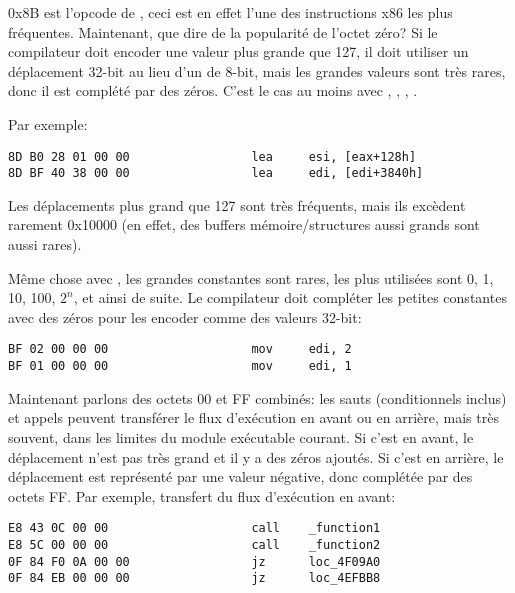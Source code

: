 0x8B est l'opcode de , ceci est en effet l'une des instructions x86 les
plus fréquentes.
Maintenant, que dire de la popularité de l'octet zéro?
Si le compilateur doit encoder une valeur plus grande que 127, il doit utiliser un
déplacement 32-bit au lieu d'un de 8-bit, mais les grandes valeurs sont très rares,
donc il est complété par des zéros.
C'est le cas au moins avec , , , .

Par exemple:

\begin{lstlisting}[style=customasmx86]
8D B0 28 01 00 00                 lea     esi, [eax+128h]
8D BF 40 38 00 00                 lea     edi, [edi+3840h]
\end{lstlisting}

Les déplacements plus grand que 127 sont très fréquents, mais ils excèdent rarement
0x10000 (en effet, des buffers mémoire/structures aussi grands sont aussi rares).

Même chose avec , les grandes constantes sont rares, les plus utilisées sont
0, 1, 10, 100, $2^n$, et ainsi de suite.
Le compilateur doit compléter les petites constantes avec des zéros pour les encoder
comme des valeurs 32-bit:

\begin{lstlisting}[style=customasmx86]
BF 02 00 00 00                    mov     edi, 2
BF 01 00 00 00                    mov     edi, 1
\end{lstlisting}

Maintenant parlons des octets 00 et FF combinés: les sauts (conditionnels inclus)
et appels peuvent transférer le flux d'exécution en avant ou en arrière, mais très
souvent, dans les limites du module exécutable courant.
Si c'est en avant, le déplacement n'est pas très grand et il y a des zéros ajoutés.
Si c'est en arrière, le déplacement est représenté par une valeur négative, donc
complétée par des octets FF.
Par exemple, transfert du flux d'exécution en avant:

\begin{lstlisting}[style=customasmx86]
E8 43 0C 00 00                    call    _function1
E8 5C 00 00 00                    call    _function2
0F 84 F0 0A 00 00                 jz      loc_4F09A0
0F 84 EB 00 00 00                 jz      loc_4EFBB8
\end{lstlisting}

